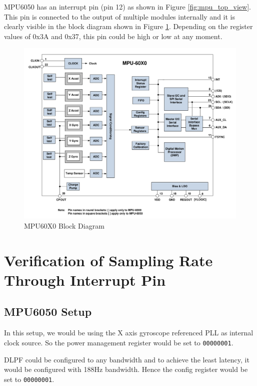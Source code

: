 \documentclass{article}
\begin{document}
	MPU6050 has an interrupt pin (pin 12) as shown in Figure \ref{fig:mpu_top_view}. This pin is connected to the output of multiple modules internally and it is clearly visible in the block diagram shown in Figure \ref{fig:mpu_block_diagram}. Depending on the register values of 0x3A and 0x37, this pin could be high or low at any moment.
	
	\begin{figure}[H]
		\centering
		\includegraphics[width=\textwidth]{figs/mpu_block_diagram.png}
		\caption{MPU60X0 Block Diagram\cite{mpu6050-product-spec}}
		\label{fig:mpu_block_diagram}
	\end{figure}

	
	\section{Verification of Sampling Rate Through Interrupt Pin}
	
	\subsection{MPU6050 Setup}
	
	In this setup, we would be using the X axis gyroscope referenced PLL as internal clock source. So the power management register would be set to \texttt{00000001}. 
	
	DLPF could be configured to any bandwidth and to achieve the least latency, it would be configured with 188Hz bandwidth. Hence the config register would be set to \texttt{00000001}. 
	
\end{document}
